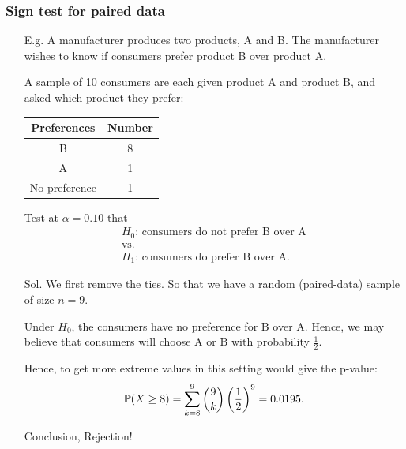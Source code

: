 \begin{frame}[fragile]
	\frametitle{Sign test for paired data}
	\begin{itemize}
		\item[E.g.] A manufacturer produces two products, A and B. The manufacturer wishes to know if consumers prefer product B over product A.
		\item[] A sample of 10 consumers are each given product A and product B, and asked which product they prefer:\\
		\begin{center}
				\begin{tabular}{c|c}
				\renewcommand{\arraystretch}{2}
				Preferences   & Number \\
				\hline
				B             & 8 \\
				A             & 1 \\
				No preference & 1 \\
				\end{tabular}
		\end{center}
		\bigskip
	\item[] Test at $\alpha=0.10$ that
	\begin{gather*}
		\text{$H_0$: consumers do not prefer B over A}\\
		\text{vs.}\\
		\text{$H_1$: consumers do prefer B over A}.
	\end{gather*}
	\end{itemize}
\end{frame}
\begin{frame}[fragile]
\begin{itemize}
	\item[Sol.] We first remove the ties. So that we have a random (paired-data) sample of size $n=9$.
	\bigskip

	\item[] Under $H_0$, the consumers have no preference for B over A. Hence, we may believe that consumers will choose A or B with probability $\frac{1}{2}$.
	\bigskip

	\item[] Hence, to get more extreme values in this setting would give the p-value:
	\begin{align*}
		\mathbb{P}(X\ge 8) = \sum_{k=8}^9 \binom{9}{k} \left(\frac{1}{2}\right)^{9} = 0.0195.
	\end{align*}
	\bigskip

	\item[] Conclusion, Rejection! \myQED
\end{itemize}
\end{frame}
